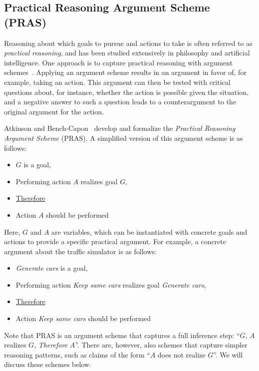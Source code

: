\subsection{Practical Reasoning Argument Scheme (PRAS)}
\label{sect:background:pras}

Reasoning about which goals to pursue and actions to take is often referred to as \emph{practical reasoning}, and has been studied extensively in philosophy and artificial intelligence. One approach is to capture practical reasoning with argument schemes~\cite{walton1990}. Applying an argument scheme results in an argument in favor of, for example, taking an action. This argument can then be tested with critical questions about, for instance, whether the action is possible given the situation, and a negative answer to such a question leads to a counterargument to the original argument for the action. 

Atkinson and Bench-Capon~\cite{atkinson2007} develop and formalize the \emph{Practical Reasoning Argument Scheme} (PRAS). A simplified version of this argument scheme is as follows:

\begin{itemize}
\item[] $G$ is a goal,
\item[] Performing action $A$ realizes goal $G$,
\item[] \underline{Therefore} 
\item[] Action $A$ should be performed
\end{itemize}

Here, $G$ and $A$ are variables, which can be instantiated with concrete goals and actions to provide a specific practical argument. For example, a concrete argument about the traffic simulator is as follows: 
\begin{itemize}
\item[] \emph{Generate cars} is a goal,
\item[] Performing action \emph{Keep same cars} realizes goal \emph{Generate cars}, 
\item[] \underline{Therefore} 
\item[] Action \emph{Keep same cars} should be performed
\end{itemize}

Note that PRAS is an argument scheme that captures a full inference step: ``$G$, $A$ realizes $G$, \emph{Therefore} $A$''. There are, however, also schemes that capture simpler reasoning patterns, such as claims of the form ``$A$ does not realize $G$''. We will discuss these schemes below. 

